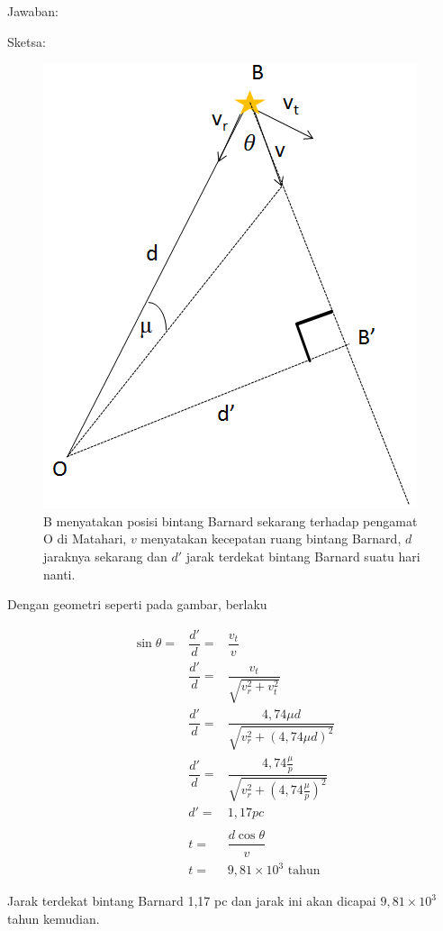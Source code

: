 \documentclass[11pt,fleqn]{exam}
\begin{document}
\begin{questions}
Jawaban:

Sketsa:

\begin{figure}[H]
\centering
\includegraphics[scale=0.55]{barnard.png}
\caption{B menyatakan posisi bintang Barnard sekarang terhadap pengamat O di Matahari, $v$ menyatakan kecepatan ruang bintang Barnard, $d$ jaraknya sekarang dan $d'$ jarak terdekat bintang Barnard suatu hari nanti.}
\end{figure}

Dengan geometri seperti pada gambar, berlaku

\begin{eqnarray*}
\sin \theta=&\dfrac{d'}{d}=&\dfrac{v_t}{v}\\
&\dfrac{d'}{d}=&\dfrac{v_t}{\sqrt{v_r^2+v_t^2}}\\
&\dfrac{d'}{d}=&\dfrac{4,74\mu d}{\sqrt{v_r^2+(4,74\mu d)^2}}\\
&\dfrac{d'}{d}=&\dfrac{4,74\frac{\mu}{p}}{\sqrt{v_r^2+(4,74\frac{\mu}{p})^2}}\\
&d'=&1,17 pc\\
\\
&t=&\dfrac{d\cos \theta}{v}\\
&t=&9,81\times10^3 \text{  tahun}
\end{eqnarray*}

Jarak terdekat bintang Barnard 1,17 pc dan jarak ini akan dicapai $9,81\times10^3$ tahun kemudian.\\



\end{questions}
\end{document}
